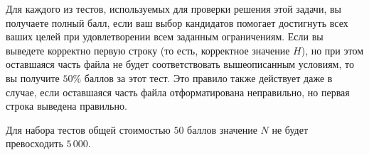 Для каждого из тестов, используемых для проверки решения этой задачи, вы получаете полный
балл, если ваш выбор кандидатов помогает достигнуть всех ваших целей при удовлетворении всем заданным ограничениям. Если вы выведете корректно первую строку (то есть, корректное
значение $H$), но при этом оставшаяся часть файла не будет соответствовать вышеописанным
условиям, то вы получите $50\%$ баллов за этот тест. Это правило также действует даже в случае, если оставшаяся часть файла отформатирована неправильно, но первая строка выведена правильно.

Для набора тестов общей стоимостью $50$ баллов значение $N$ не будет превосходить $5\,000$.
